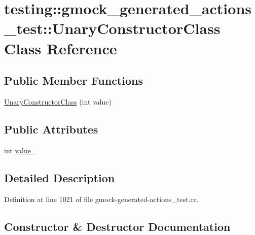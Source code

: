 \hypertarget{classtesting_1_1gmock__generated__actions__test_1_1_unary_constructor_class}{}\section{testing\+:\+:gmock\+\_\+generated\+\_\+actions\+\_\+test\+:\+:Unary\+Constructor\+Class Class Reference}
\label{classtesting_1_1gmock__generated__actions__test_1_1_unary_constructor_class}
\subsection*{Public Member Functions}
\begin{DoxyCompactItemize}
\item 
\hyperlink{classtesting_1_1gmock__generated__actions__test_1_1_unary_constructor_class_a35b2c0aab3928c1d558c11b6652a7262}{Unary\+Constructor\+Class} (int value)
\end{DoxyCompactItemize}
\subsection*{Public Attributes}
\begin{DoxyCompactItemize}
\item 
int \hyperlink{classtesting_1_1gmock__generated__actions__test_1_1_unary_constructor_class_a5e96ce337c5eb7016eba2ea66ae46851}{value\+\_\+}
\end{DoxyCompactItemize}


\subsection{Detailed Description}


Definition at line 1021 of file gmock-\/generated-\/actions\+\_\+test.\+cc.



\subsection{Constructor \& Destructor Documentation}
